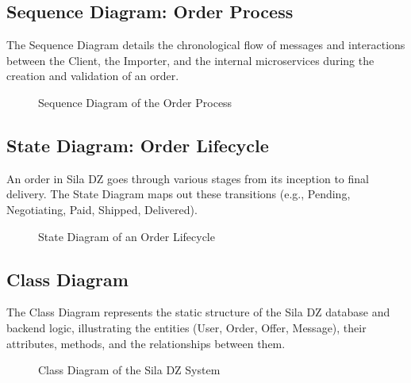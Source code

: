 \subsection{Sequence Diagram: Order Process}
The Sequence Diagram details the chronological flow of messages and interactions between the Client, the Importer, and the internal microservices during the creation and validation of an order.

\begin{figure}[H]
    \centering
    \vspace{8cm} %
    \caption{Sequence Diagram of the Order Process}
    \label{fig:sequence}
\end{figure}

\subsection{State Diagram: Order Lifecycle}
An order in Sila DZ goes through various stages from its inception to final delivery. The State Diagram maps out these transitions (e.g., Pending, Negotiating, Paid, Shipped, Delivered).

\begin{figure}[H]
    \centering
    \vspace{8cm} %
    \caption{State Diagram of an Order Lifecycle}
    \label{fig:state}
\end{figure}

\subsection{Class Diagram}
The Class Diagram represents the static structure of the Sila DZ database and backend logic, illustrating the entities (User, Order, Offer, Message), their attributes, methods, and the relationships between them.

\begin{figure}[H]
    \centering
    \vspace{8cm} %
    \caption{Class Diagram of the Sila DZ System}
    \label{fig:class}
\end{figure}
